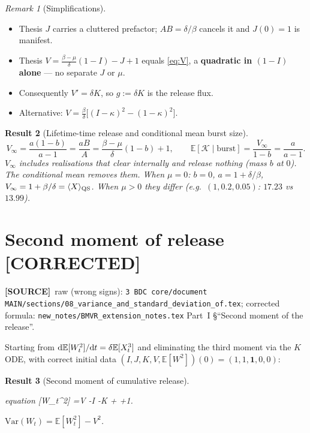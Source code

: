 \documentclass[11pt,a4paper]{article}
\newcommand{\dd}{{\rm d}}
\newcommand{\E}{\mathbb{E}}
\newcommand{\xt}{X_t}
\newcommand{\wt}{W_t}
\newcommand{\Kb}{\mathcal{K}}
\newcommand{\Aa}{A}
\newcommand{\Bb}{B}
\theoremstyle{plain}
\newtheorem{result}{Result}[section]
\theoremstyle{definition}
\theoremstyle{remark}
\newtheorem{remark}[result]{Remark}
\newcommand{\COR}{\textcolor{green!40!black}{\textbf{[CORRECTED]}}}
\newcommand{\SOURCE}{\textcolor{gray!50!black}{\textbf{[SOURCE]}}}
\begin{document}
\begin{remark}[Simplifications]
\begin{itemize}
\item Thesis $J$ carries a cluttered prefactor; $\Aa\Bb=\delta/\beta$ cancels it
  and $J(0)=1$ is manifest.
\item Thesis $V=\frac{\beta-\mu}{\delta}(1-I)-J+1$ equals \eqref{eq:V}, a
  \textbf{quadratic in $(1-I)$ alone} --- no separate $J$ or $\mu$.
\item Consequently $V'=\delta K$, so $g:=\delta K$ is the release flux.
\item Alternative: $V=\frac{\beta}{\delta}\bigl[(I-\kappa)^2-(1-\kappa)^2\bigr]$.
\end{itemize}
\end{remark}

\begin{result}[Lifetime-time release and conditional mean burst size]
\begin{equation}
V_\infty=\frac{a(1-b)}{a-1}=\frac{a\Bb}{\Aa}
=\frac{\beta-\mu}{\delta}(1-b)+1,
\qquad
\E[\Kb\mid\text{burst}]=\frac{V_\infty}{1-b}=\frac{a}{a-1}.
\end{equation}
$V_\infty$ \emph{includes} realisations that clear internally and release nothing
(mass $b$ at $0$). The conditional mean removes them.
When $\mu=0$: $b=0$, $a=1+\delta/\beta$, $V_\infty=1+\beta/\delta=\langle X\rangle_{\rm QS}$.
When $\mu>0$ they differ (e.g.\ $(1,0.2,0.05)$: $17.23$ vs $13.99$).
\end{result}

\section{Second moment of release \COR}
\label{sec:EW2}
\SOURCE\
raw (wrong signs):
\texttt{3 BDC core/document MAIN/sections/08\_variance\_and\_standard\_deviation\_of.tex};
corrected formula:
\texttt{new\_notes/BMVR\_extension\_notes.tex} Part~I \S``Second moment of the release''.

Starting from $\dd\E[\wt^2]/\dd t=\delta\E[\xt^3]$ and eliminating the third
moment via the $K$ ODE, with correct initial data
$(I,J,K,V,\E[W^2])(0)=(1,1,\mathbf{1},0,0)$:

\begin{result}[Second moment of cumulative release]
\begin{empheq}[box=\fbox]{equation}
\E[\wt^2]
=V
-\frac{\beta+\mu}{\delta}I
-K
+\frac{\beta+\mu}{\delta}
+1.
\label{eq:EW2}
\end{empheq}
$\mathrm{Var}(\wt)=\E[\wt^2]-V^2$.
\end{result}
\end{document}
